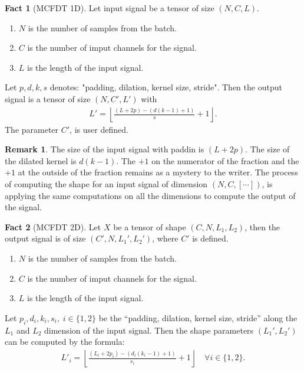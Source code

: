\documentclass[]{article}
\theoremstyle{definition}
\newtheorem{remark}{Remark}[subsection]
{
    \newtheorem{assumption}{Assumption}
}
\newtheorem{fact}{Fact}[subsection]
\numberwithin{equation}{subsection}
\begin{document}
        \begin{fact}[MCFDT 1D]
            Let input signal be a tensor of size $(N, C, L)$. 
            \begin{enumerate}
                \item $N$ is the number of samples from the batch. 
                \item $C$ is the number of imput channels for the signal. 
                \item $L$ is the length of the input signal. 
            \end{enumerate}
            Let $p, d, k, s$ denotes: "padding, dilation, kernel size, stride". 
            Then the output signal is a tensor of size $(N, C', L')$ with 
            \begin{align}
                L' = \left\lfloor
                    \frac{(L + 2p)- (d(k-1)+1)}{s} + 1
                \right\rfloor. 
            \end{align}
            The parameter $C'$, is user defined. 
        \end{fact}
        \begin{remark}
            The size of the input signal with paddin is $(L + 2p)$. 
            The size of the dilated kernel is $d(k - 1)$. 
            The $+1$ on the numerator of the fraction and the $+1$ at the outside of the fraction remains as a mystery to the writer. 
            The process of computing the shape for an input signal of dimension $(N, C, [\cdots])$, is applying the same computations on all the dimensions to compute the output of the signal. 
        \end{remark}
        \begin{fact}[MCFDT 2D]\label{fact:MCFDT_2D}
            Let $X$ be a tensor of shape $(C, N, L_1, L_2)$, then the output signal is of size $(C', N, L_1', L_2')$, where $C'$ is defined. 
            \begin{enumerate}
                \item $N$ is the number of samples from the batch. 
                \item $C$ is the number of imput channels for the signal. 
                \item $L$ is the length of the input signal. 
            \end{enumerate}
            
            Let $p_i,d_i,k_i,s_i, \; i \in \{1, 2\}$ be the ``padding, dilation, kernel size, stride'' along the $L_1$ and $L_2$ dimension of the input signal. 
            Then the shape parameters $(L_1', L_2')$ can be computed by the formula: 
            $$
            \begin{aligned}
                L'_i = \left\lfloor
                \frac{(L_i + 2p_i)- (d_i(k_i-1)+1)}{s_i} + 1
                \right\rfloor \quad \forall i \in \{1, 2\}. 
            \end{aligned}
            $$
        \end{fact}
\end{document}
